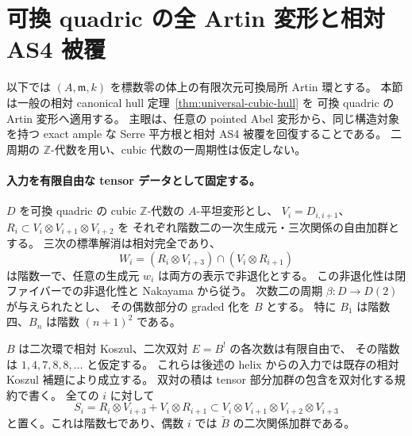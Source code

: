 \section{可換 quadric の全 Artin 変形と相対 AS4 被覆}
\label{sec:quadric-artin-hull}

以下では $(A,\mathfrak m,k)$ を標数零の体上の有限次元可換局所 Artin 環とする。
本節は一般の相対 canonical hull 定理~\ref{thm:universal-cubic-hull} を
可換 quadric の Artin 変形へ適用する。
主眼は、任意の pointed Abel 変形から、同じ構造対象を持つ exact ample な
Serre 平方根と相対 AS4 被覆を回復することである。
二周期の $\mathbb Z$-代数を用い、cubic 代数の一周期性は仮定しない。

\paragraph{入力を有限自由な tensor データとして固定する。}
$D$ を可換 quadric の cubic $\mathbb Z$-代数の $A$-平坦変形とし、
$V_i=D_{i,i+1}$、$R_i\subset V_i\otimes V_{i+1}\otimes V_{i+2}$ を
それぞれ階数二の一次生成元・三次関係の自由加群とする。
三次の標準解消は相対完全であり、
\[
 W_i=(R_i\otimes V_{i+3})\cap(V_i\otimes R_{i+1})
\]
は階数一で、任意の生成元 $w_i$ は両方の表示で非退化とする。
この非退化性は閉ファイバーでの非退化性と Nakayama から従う。
次数二の周期 $\beta:D\to D(2)$ が与えられたとし、
その偶数部分の graded 化を $B$ とする。
特に $B_1$ は階数四、$B_n$ は階数 $(n+1)^2$ である。

$B$ は二次環で相対 Koszul、二次双対 $E=B^!$ の各次数は有限自由で、
その階数は $1,4,7,8,8,\ldots$ と仮定する。
これらは後述の helix からの入力では既存の相対 Koszul 補題により成立する。
双対の積は tensor 部分加群の包含を双対化する規約で書く。
全ての $i$ に対して
\[
 S_i=R_i\otimes V_{i+3}+V_i\otimes R_{i+1}
 \subset V_i\otimes V_{i+1}\otimes V_{i+2}\otimes V_{i+3}
\]
と置く。これは階数七であり、偶数 $i$ では $\check B$ の二次関係加群である。

